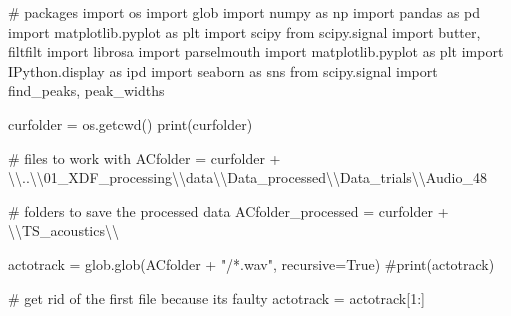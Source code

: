 \documentclass[
  letterpaper,
  DIV=11,
  numbers=noendperiod]{scrreprt}
\newenvironment{Shaded}{\begin{snugshade}}{\end{snugshade}}
\newcommand{\BuiltInTok}[1]{\textcolor[rgb]{0.00,0.23,0.31}{#1}}
\newcommand{\CharTok}[1]{\textcolor[rgb]{0.13,0.47,0.30}{#1}}
\newcommand{\CommentTok}[1]{\textcolor[rgb]{0.37,0.37,0.37}{#1}}
\newcommand{\DecValTok}[1]{\textcolor[rgb]{0.68,0.00,0.00}{#1}}
\newcommand{\ImportTok}[1]{\textcolor[rgb]{0.00,0.46,0.62}{#1}}
\newcommand{\NormalTok}[1]{\textcolor[rgb]{0.00,0.23,0.31}{#1}}
\newcommand{\OperatorTok}[1]{\textcolor[rgb]{0.37,0.37,0.37}{#1}}
\newcommand{\StringTok}[1]{\textcolor[rgb]{0.13,0.47,0.30}{#1}}
\newcommand{\VariableTok}[1]{\textcolor[rgb]{0.07,0.07,0.07}{#1}}
\begin{document}
\begin{Shaded}
\begin{Highlighting}[]
\CommentTok{\# packages}
\ImportTok{import}\NormalTok{ os}
\ImportTok{import}\NormalTok{ glob}
\ImportTok{import}\NormalTok{ numpy }\ImportTok{as}\NormalTok{ np}
\ImportTok{import}\NormalTok{ pandas }\ImportTok{as}\NormalTok{ pd}
\ImportTok{import}\NormalTok{ matplotlib.pyplot }\ImportTok{as}\NormalTok{ plt}
\ImportTok{import}\NormalTok{ scipy}
\ImportTok{from}\NormalTok{ scipy.signal }\ImportTok{import}\NormalTok{ butter, filtfilt}
\ImportTok{import}\NormalTok{ librosa}
\ImportTok{import}\NormalTok{ parselmouth}
\ImportTok{import}\NormalTok{ matplotlib.pyplot }\ImportTok{as}\NormalTok{ plt}
\ImportTok{import}\NormalTok{ IPython.display }\ImportTok{as}\NormalTok{ ipd}
\ImportTok{import}\NormalTok{ seaborn }\ImportTok{as}\NormalTok{ sns}
\ImportTok{from}\NormalTok{ scipy.signal }\ImportTok{import}\NormalTok{ find\_peaks, peak\_widths}

\NormalTok{curfolder }\OperatorTok{=}\NormalTok{ os.getcwd()}
\BuiltInTok{print}\NormalTok{(curfolder)}

\CommentTok{\# files to work with}
\NormalTok{ACfolder }\OperatorTok{=}\NormalTok{ curfolder }\OperatorTok{+} \StringTok{\textquotesingle{}}\CharTok{\textbackslash{}\textbackslash{}}\StringTok{..}\CharTok{\textbackslash{}\textbackslash{}}\StringTok{01\_XDF\_processing}\CharTok{\textbackslash{}\textbackslash{}}\StringTok{data}\CharTok{\textbackslash{}\textbackslash{}}\StringTok{Data\_processed}\CharTok{\textbackslash{}\textbackslash{}}\StringTok{Data\_trials}\CharTok{\textbackslash{}\textbackslash{}}\StringTok{Audio\_48\textquotesingle{}}

\CommentTok{\# folders to save the processed data}
\NormalTok{ACfolder\_processed }\OperatorTok{=}\NormalTok{ curfolder }\OperatorTok{+} \StringTok{\textquotesingle{}}\CharTok{\textbackslash{}\textbackslash{}}\StringTok{TS\_acoustics}\CharTok{\textbackslash{}\textbackslash{}}\StringTok{\textquotesingle{}}

\NormalTok{actotrack }\OperatorTok{=}\NormalTok{ glob.glob(ACfolder }\OperatorTok{+} \StringTok{"/*.wav"}\NormalTok{, recursive}\OperatorTok{=}\VariableTok{True}\NormalTok{)}
\CommentTok{\#print(actotrack)}

\CommentTok{\# get rid of the first file because it\textquotesingle{}s faulty}
\NormalTok{actotrack }\OperatorTok{=}\NormalTok{ actotrack[}\DecValTok{1}\NormalTok{:]}
\end{Highlighting}
\end{Shaded}
\end{document}
